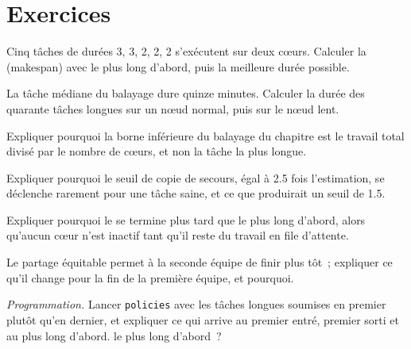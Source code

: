\section{Exercices}

\begin{exercise}[$\star$]\label{exo:pl:distributed-compute-and-schedulers:1}
Cinq tâches de durées 3, 3, 2, 2, 2 s'exécutent sur deux cœurs. Calculer la  (makespan) avec le plus long d'abord, puis la meilleure durée possible.
\end{exercise}

\begin{exercise}[$\star$]\label{exo:pl:distributed-compute-and-schedulers:2}
La tâche médiane du balayage dure quinze minutes. Calculer la durée des quarante tâches longues sur un nœud normal, puis sur le nœud lent.
\end{exercise}

\begin{exercise}[$\star$]\label{exo:pl:distributed-compute-and-schedulers:3}
Expliquer pourquoi la borne inférieure du balayage du chapitre est le travail total divisé par le nombre de cœurs, et non la tâche la plus longue.
\end{exercise}

\begin{exercise}[$\star\star$]\label{exo:pl:distributed-compute-and-schedulers:4}
Expliquer pourquoi le seuil de copie de secours, égal à 2.5 fois l'estimation, se déclenche rarement pour une tâche saine, et ce que produirait un seuil de 1.5.
\end{exercise}

\begin{exercise}[$\star\star$]\label{exo:pl:distributed-compute-and-schedulers:5}
Expliquer pourquoi le  se termine plus tard que le plus long d'abord, alors qu'aucun cœur n'est inactif tant qu'il reste du travail en file d'attente.
\end{exercise}

\begin{exercise}[$\star\star$]\label{exo:pl:distributed-compute-and-schedulers:6}
Le partage équitable permet à la seconde équipe de finir plus tôt~; expliquer ce qu'il change pour la fin de la première équipe, et pourquoi.
\end{exercise}

\begin{exercise}[$\star\star\star$]\label{exo:pl:distributed-compute-and-schedulers:7}
\emph{Programmation.} Lancer \texttt{policies} avec les tâches longues soumises en premier plutôt qu'en dernier, et expliquer ce qui arrive au premier entré, premier sorti et au plus long d'abord.
le plus long d'abord~?
\end{exercise}

